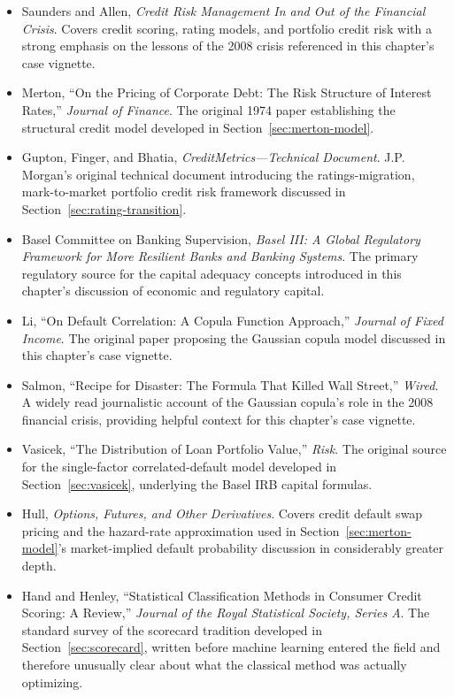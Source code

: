 \documentclass[../ai_in_finance]{subfiles}
\begin{document}
\begin{itemize}
    \item Saunders and Allen, \emph{Credit Risk Management In and Out of the Financial Crisis}. Covers credit scoring, rating models, and portfolio credit risk with a strong emphasis on the lessons of the 2008 crisis referenced in this chapter's case vignette.
    \item Merton, ``On the Pricing of Corporate Debt: The Risk Structure of Interest Rates,'' \emph{Journal of Finance}. The original 1974 paper establishing the structural credit model developed in Section~\ref{sec:merton-model}.
    \item Gupton, Finger, and Bhatia, \emph{CreditMetrics---Technical Document}. J.P. Morgan's original technical document introducing the ratings-migration, mark-to-market portfolio credit risk framework discussed in Section~\ref{sec:rating-transition}.
    \item Basel Committee on Banking Supervision, \emph{Basel III: A Global Regulatory Framework for More Resilient Banks and Banking Systems}. The primary regulatory source for the capital adequacy concepts introduced in this chapter's discussion of economic and regulatory capital.
    \item Li, ``On Default Correlation: A Copula Function Approach,'' \emph{Journal of Fixed Income}. The original paper proposing the Gaussian copula model discussed in this chapter's case vignette.
    \item Salmon, ``Recipe for Disaster: The Formula That Killed Wall Street,'' \emph{Wired}. A widely read journalistic account of the Gaussian copula's role in the 2008 financial crisis, providing helpful context for this chapter's case vignette.
    \item Vasicek, ``The Distribution of Loan Portfolio Value,'' \emph{Risk}. The original source for the single-factor correlated-default model developed in Section~\ref{sec:vasicek}, underlying the Basel IRB capital formulas.
    \item Hull, \emph{Options, Futures, and Other Derivatives}. Covers credit default swap pricing and the hazard-rate approximation used in Section~\ref{sec:merton-model}'s market-implied default probability discussion in considerably greater depth.
    \item Hand and Henley, ``Statistical Classification Methods in Consumer Credit Scoring: A Review,'' \emph{Journal of the Royal Statistical Society, Series A}. The standard survey of the scorecard tradition developed in Section~\ref{sec:scorecard}, written before machine learning entered the field and therefore unusually clear about what the classical method was actually optimizing.

\end{itemize}
\end{document}
